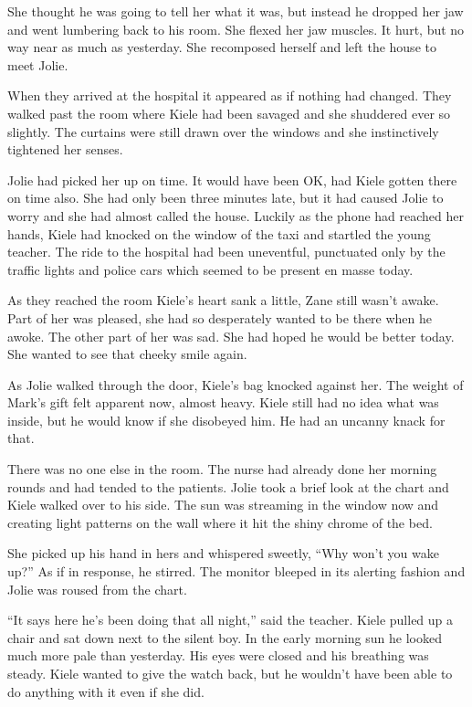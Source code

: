 She thought he was going to tell her what it was, but instead he dropped her jaw and went lumbering back to his room.  She flexed her jaw muscles.  It hurt, but no way near as much as yesterday.  She recomposed herself and left the house to meet Jolie.



\thoughtbreak



When they arrived at the hospital it appeared as if nothing had changed.  They walked past the room where Kiele had been savaged and she shuddered ever so slightly.  The curtains were still drawn over the windows and she instinctively tightened her senses.  

Jolie had picked her up on time.   It would have been OK, had Kiele gotten there on time also.  She had only been three minutes late, but it had caused Jolie to worry and she had almost called the house.  Luckily as the phone had reached her hands, Kiele had knocked on the window of the taxi and startled the young teacher.  The ride to the hospital had been uneventful, punctuated only by the traffic lights and police cars which seemed to be present en masse today.  

As they reached the room Kiele's heart sank a little, Zane still wasn't awake.  Part of her was pleased, she had so desperately wanted to be there when he awoke.  The other part of her was sad.  She had hoped he would be better today.  She wanted to see that cheeky smile again.  

As Jolie walked through the door, Kiele's bag knocked against her.  The weight of Mark's gift felt apparent now, almost heavy.  Kiele still had no idea what was inside, but he would know if she disobeyed him.  He had an uncanny knack for that.

There was no one else in the room.  The nurse had already done her morning rounds and had tended to the patients.  Jolie took a brief look at the chart and Kiele walked over to his side.  The sun was streaming in the window now and creating light patterns on the wall where it hit the shiny chrome of the bed.  

She picked up his hand in hers and whispered sweetly, ``Why won't you wake up?''  As if in response, he stirred.  The monitor bleeped in its alerting fashion and Jolie was roused from the chart.  

``It says here he's been doing that all night,'' said the teacher.  Kiele pulled up a chair and sat down next to the silent boy.  In the early morning sun he looked much more pale than yesterday.  His eyes were closed and his breathing was steady.  Kiele wanted to give the watch back, but he wouldn't have been able to do anything with it even if she did.

